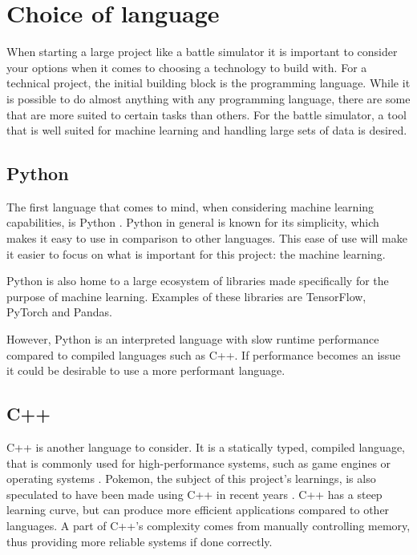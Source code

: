 \section{Choice of language}
\label{sec:choice-of-language}

When starting a large project like a battle simulator it is important to consider your options when it comes to choosing a technology to build with.
For a technical project, the initial building block is the programming language. While it is possible to do almost anything with any 
programming language, there are some that are more suited to certain tasks than others. For the battle simulator, a tool that is well 
suited for machine learning and handling large sets of data is desired.

\subsection{Python}
The first language that comes to mind, when considering machine learning capabilities, is Python \cite{PythonForMachineLearning}.
Python in general is known for its simplicity, which makes it easy to use in comparison to other languages. This ease of use will make it
easier to focus on what is important for this project: the machine learning.

Python is also home to a large ecosystem of libraries made specifically for the purpose of machine learning. Examples of these libraries are
TensorFlow, PyTorch and Pandas.

However, Python is an interpreted language with slow runtime performance compared to compiled languages such as C++. 
If performance becomes an issue it could be desirable to use a more performant language.


\subsection{C++}
C++ is another language to consider. It is a statically typed, compiled language, that is commonly used for high-performance systems, such as
game engines or operating systems \cite{C++}. Pokemon, the subject of this project's learnings, is also speculated to have been made using C++ in recent years \cite{PokemonProgrammingLanguageForumPost}\cite{NintendoDataLeak}\cite{ChatGPTPokemonProgrammingLanguage}.
C++ has a steep learning curve, but can produce more efficient applications compared to other languages. 
A part of C++'s complexity comes from manually controlling memory, thus providing more reliable systems if done correctly. 

